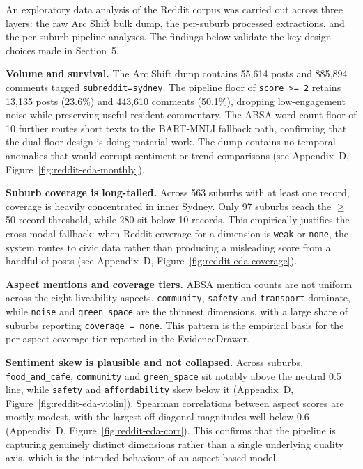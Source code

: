 \documentclass[11pt,a4paper]{article}
\newcounter{none}
\newcommand{\passthrough}[1]{#1}
\begin{document}
An exploratory data analysis of the Reddit corpus was carried out across three layers: the raw Arc Shift bulk dump, the per-suburb processed extractions, and the per-suburb pipeline analyses. The findings below validate the key design choices made in Section~5.

\textbf{Volume and survival.} The Arc Shift dump contains 55,614 posts and 885,894 comments tagged \passthrough{\lstinline!subreddit=sydney!}. The pipeline floor of \passthrough{\lstinline!score >= 2!} retains 13,135 posts (23.6\%) and 443,610 comments (50.1\%), dropping low-engagement noise while preserving useful resident commentary. The ABSA word-count floor of 10 further routes short texts to the BART-MNLI fallback path, confirming that the dual-floor design is doing material work. The dump contains no temporal anomalies that would corrupt sentiment or trend comparisons (see Appendix~D, Figure~\ref{fig:reddit-eda-monthly}).

\textbf{Suburb coverage is long-tailed.} Across 563 suburbs with at least one record, coverage is heavily concentrated in inner Sydney. Only 97 suburbs reach the $\geq$50-record threshold, while 280 sit below 10 records. This empirically justifies the cross-modal fallback: when Reddit coverage for a dimension is \texttt{weak} or \texttt{none}, the system routes to civic data rather than producing a misleading score from a handful of posts (see Appendix~D, Figure~\ref{fig:reddit-eda-coverage}).

\textbf{Aspect mentions and coverage tiers.} ABSA mention counts are not uniform across the eight liveability aspects. \texttt{community}, \texttt{safety} and \texttt{transport} dominate, while \texttt{noise} and \texttt{green\_space} are the thinnest dimensions, with a large share of suburbs reporting \texttt{coverage = none}. This pattern is the empirical basis for the per-aspect coverage tier reported in the EvidenceDrawer.

\textbf{Sentiment skew is plausible and not collapsed.} Across suburbs, \texttt{food\_and\_cafe}, \texttt{community} and \texttt{green\_space} sit notably above the neutral 0.5 line, while \texttt{safety} and \texttt{affordability} skew below it (Appendix~D, Figure~\ref{fig:reddit-eda-violin}). Spearman correlations between aspect scores are mostly modest, with the largest off-diagonal magnitudes well below 0.6 (Appendix~D, Figure~\ref{fig:reddit-eda-corr}). This confirms that the pipeline is capturing genuinely distinct dimensions rather than a single underlying quality axis, which is the intended behaviour of an aspect-based model.
\end{document}

